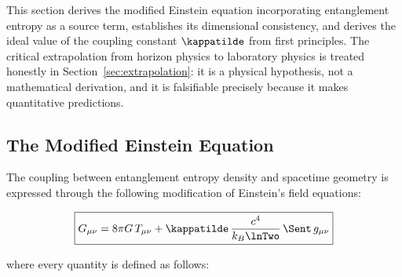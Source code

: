 This section derives the modified Einstein equation incorporating
entanglement entropy as a source term, establishes its dimensional
consistency, and derives the ideal value of the coupling constant
$\kappatilde$ from first principles. The critical extrapolation from
horizon physics to laboratory physics is treated honestly in
Section~\ref{sec:extrapolation}: it is a physical hypothesis, not a
mathematical derivation, and it is falsifiable precisely because it makes
quantitative predictions.

\subsection{The Modified Einstein Equation}
\label{subsec:modified_einstein}

The coupling between entanglement entropy density and spacetime geometry
is expressed through the following modification of Einstein's field
equations:

\begin{equation}
    \boxed{
    G_{\mu\nu} = 8\pi G\,T_{\mu\nu}
    + \kappatilde\,\frac{c^4}{k_B\lnTwo}\,\Sent\,g_{\mu\nu}
    }
    \label{eq:modified_einstein}
\end{equation}

\noindent where every quantity is defined as follows:

